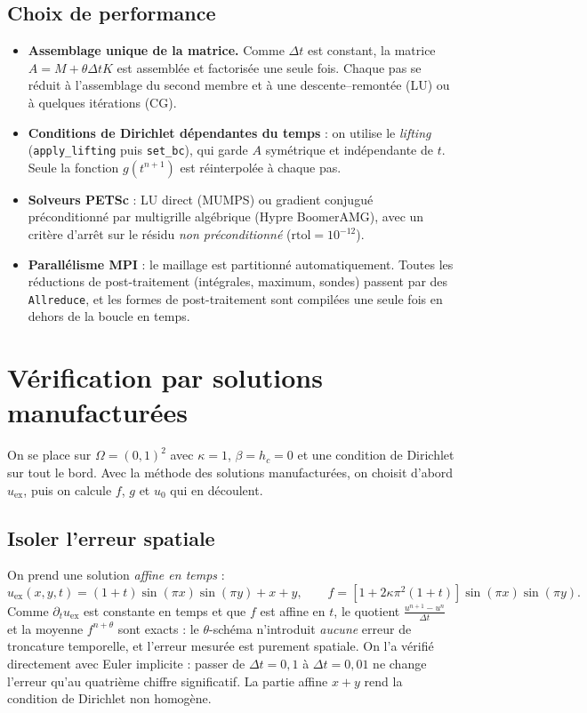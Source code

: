 \documentclass[11pt,a4paper]{article}
\begin{document}
\subsection{Choix de performance}
\begin{itemize}
  \item \textbf{Assemblage unique de la matrice.} Comme $\Delta t$ est constant, la matrice
        $A = M+\theta\Delta t K$ est assemblée et factorisée une seule fois. Chaque pas se réduit à
        l'assemblage du second membre et à une descente--remontée (LU) ou à quelques itérations (CG).
  \item \textbf{Conditions de Dirichlet dépendantes du temps} : on utilise le \emph{lifting}
        (\texttt{apply\_lifting} puis \texttt{set\_bc}), qui garde $A$ symétrique et indépendante de $t$.
        Seule la fonction $g(t^{n+1})$ est réinterpolée à chaque pas.
  \item \textbf{Solveurs PETSc} : LU direct (MUMPS) ou gradient conjugué préconditionné par multigrille
        algébrique (Hypre BoomerAMG), avec un critère d'arrêt sur le résidu \emph{non préconditionné}
        ($\text{rtol}=10^{-12}$).
  \item \textbf{Parallélisme MPI} : le maillage est partitionné automatiquement. Toutes les réductions
        de post-traitement (intégrales, maximum, sondes) passent par des \texttt{Allreduce}, et les
        formes de post-traitement sont compilées une seule fois en dehors de la boucle en temps.
\end{itemize}

\section{Vérification par solutions manufacturées}
On se place sur $\Omega=(0,1)^2$ avec $\kappa=1$, $\beta=h_c=0$ et une condition de Dirichlet sur tout
le bord. Avec la méthode des solutions manufacturées, on choisit d'abord $u_{\text{ex}}$, puis on calcule
$f$, $g$ et $u_0$ qui en découlent.

\subsection{Isoler l'erreur spatiale}
On prend une solution \emph{affine en temps} :
\begin{equation}
  u_{\text{ex}}(x,y,t) = (1+t)\sin(\pi x)\sin(\pi y) + x + y, \qquad
  f = \left[1 + 2\kappa\pi^2(1+t)\right]\sin(\pi x)\sin(\pi y).
\end{equation}
Comme $\partial_t u_{\text{ex}}$ est constante en temps et que $f$ est affine en $t$, le quotient
$\frac{u^{n+1}-u^n}{\Delta t}$ et la moyenne $f^{n+\theta}$ sont exacts : le $\theta$-schéma n'introduit
\emph{aucune} erreur de troncature temporelle, et l'erreur mesurée est purement spatiale. On l'a vérifié
directement avec Euler implicite : passer de $\Delta t = 0{,}1$ à $\Delta t=0{,}01$ ne change l'erreur
qu'au quatrième chiffre significatif. La partie affine $x+y$ rend la condition de Dirichlet non homogène.
\end{document}
